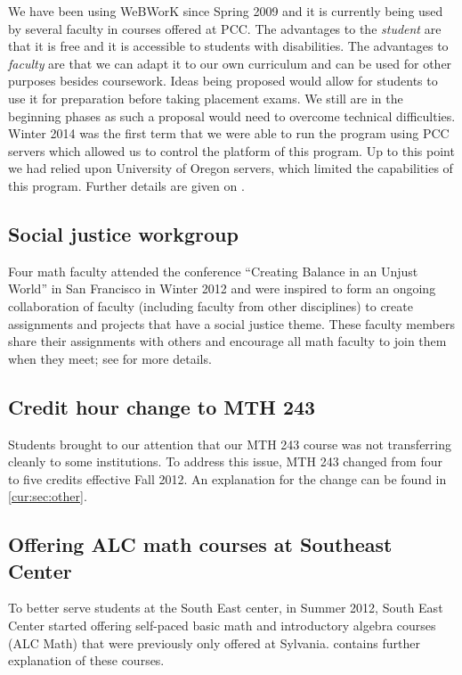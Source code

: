     We have been using WeBWorK since Spring 2009 and it is currently being used by several faculty in courses
    offered at PCC.  The advantages to the \emph{student} are that it is free and it is
    accessible to students with disabilities.   The advantages to \emph{faculty} are that
    we can adapt it to our own curriculum and can be used for other purposes
    besides coursework.   Ideas being proposed would allow for students to
    use it for preparation before taking placement exams.  We still are in the
    beginning phases as such a proposal would need to overcome technical
    difficulties.   Winter 2014 was the first term that we were able to
    run the program using PCC servers which allowed us to control the platform
    of this program.  Up to this point we had relied upon University of Oregon
    servers, which limited the capabilities of this program. Further details 
    are given on .
  \subsection{Social justice workgroup} Four math faculty attended the conference
    ``Creating Balance in an Unjust World'' in San Francisco in Winter 2012
    and were inspired to form an ongoing collaboration of faculty (including faculty from other disciplines) to create
    assignments and projects that have a social justice theme.  These faculty
    members share their assignments with others and encourage all math faculty
    to join them when they meet; see  for 
    more details.
  \subsection{Credit hour change to MTH 243} Students brought to our attention that our
    MTH 243 course was not transferring cleanly to some institutions.  To
    address this issue, MTH 243 changed from four to five credits effective Fall
    2012.  An explanation for the change can be found in \vref{cur:sec:other}.
  \subsection{Offering ALC math courses at Southeast Center} To better serve students at the South
    East center, in Summer 2012, South East Center started offering
    self-paced basic math and introductory algebra courses (ALC Math) that were previously only offered at
    Sylvania.  
    contains further explanation of these courses. 




